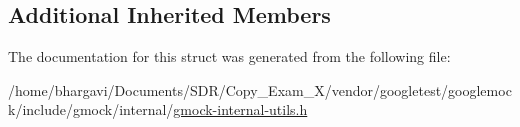 \subsection*{Additional Inherited Members}


The documentation for this struct was generated from the following file\+:\begin{DoxyCompactItemize}
\item 
/home/bhargavi/\+Documents/\+S\+D\+R/\+Copy\+\_\+\+Exam\+\_\+X/vendor/googletest/googlemock/include/gmock/internal/\hyperlink{gmock-internal-utils_8h}{gmock-\/internal-\/utils.\+h}\end{DoxyCompactItemize}
